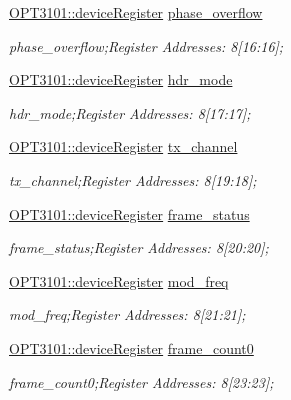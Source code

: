 \begin{DoxyCompactItemize}
\mbox{\hyperlink{class_o_p_t3101_1_1device_register}{O\+P\+T3101\+::device\+Register}} \mbox{\hyperlink{class_o_p_t3101_1_1registers_a8d491306e0b4b6e323b09ee8d1c59016}{phase\+\_\+overflow}}
\begin{DoxyCompactList}\small\item\em phase\+\_\+overflow;Register Addresses\+: 8\mbox{[}16\+:16\mbox{]}; \end{DoxyCompactList}\item 
\mbox{\hyperlink{class_o_p_t3101_1_1device_register}{O\+P\+T3101\+::device\+Register}} \mbox{\hyperlink{class_o_p_t3101_1_1registers_a78e8bc6ad4a84c7d19974ba6c58e329e}{hdr\+\_\+mode}}
\begin{DoxyCompactList}\small\item\em hdr\+\_\+mode;Register Addresses\+: 8\mbox{[}17\+:17\mbox{]}; \end{DoxyCompactList}\item 
\mbox{\hyperlink{class_o_p_t3101_1_1device_register}{O\+P\+T3101\+::device\+Register}} \mbox{\hyperlink{class_o_p_t3101_1_1registers_a53518f25f00a5926fda5f0d37ad82fcb}{tx\+\_\+channel}}
\begin{DoxyCompactList}\small\item\em tx\+\_\+channel;Register Addresses\+: 8\mbox{[}19\+:18\mbox{]}; \end{DoxyCompactList}\item 
\mbox{\hyperlink{class_o_p_t3101_1_1device_register}{O\+P\+T3101\+::device\+Register}} \mbox{\hyperlink{class_o_p_t3101_1_1registers_ab8c08b83252a06c3c59b4b33b4b1a8ba}{frame\+\_\+status}}
\begin{DoxyCompactList}\small\item\em frame\+\_\+status;Register Addresses\+: 8\mbox{[}20\+:20\mbox{]}; \end{DoxyCompactList}\item 
\mbox{\hyperlink{class_o_p_t3101_1_1device_register}{O\+P\+T3101\+::device\+Register}} \mbox{\hyperlink{class_o_p_t3101_1_1registers_ad0a150fb8c5e1efeae026e76f2bdbc1f}{mod\+\_\+freq}}
\begin{DoxyCompactList}\small\item\em mod\+\_\+freq;Register Addresses\+: 8\mbox{[}21\+:21\mbox{]}; \end{DoxyCompactList}\item 
\mbox{\hyperlink{class_o_p_t3101_1_1device_register}{O\+P\+T3101\+::device\+Register}} \mbox{\hyperlink{class_o_p_t3101_1_1registers_a93e937bf8d82f09a6024dd226118ef51}{frame\+\_\+count0}}
\begin{DoxyCompactList}\small\item\em frame\+\_\+count0;Register Addresses\+: 8\mbox{[}23\+:23\mbox{]}; \end{DoxyCompactList}\item 

\end{DoxyCompactItemize}
